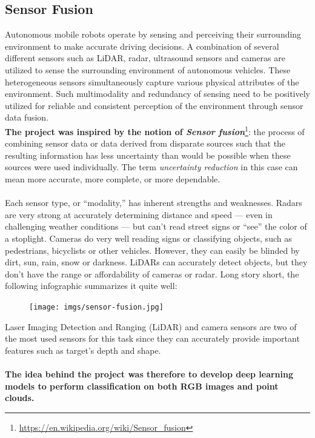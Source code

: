 \documentclass[11pt,a4paper]{article}
\begin{document}
\subsection{Sensor Fusion}
Autonomous mobile robots\cite{s18082730} operate by sensing and perceiving their surrounding environment to make accurate driving decisions. A combination of several different sensors such as LiDAR, radar, ultrasound sensors and cameras are utilized to sense the surrounding environment of autonomous vehicles. These heterogeneous sensors simultaneously capture various physical attributes of the environment. Such multimodality and redundancy of sensing need to be positively utilized for reliable and consistent perception of the environment through sensor data fusion.\\
\textbf{The project was inspired by the notion of \textit{Sensor fusion}}\footnote{\url{https://en.wikipedia.org/wiki/Sensor_fusion}}: the process of combining sensor data or data derived from disparate sources such that the resulting information has less uncertainty than would be possible when these sources were used individually. The term \textit{uncertainty reduction} in this case can mean more accurate, more complete, or more dependable.\\
\\
Each sensor type, or “modality,” has inherent strengths and weaknesses. Radars are very strong at accurately determining distance and speed — even in challenging weather conditions — but can’t read street signs or “see” the color of a stoplight. Cameras do very well reading signs or classifying objects, such as pedestrians, bicyclists or other vehicles. However, they can easily be blinded by dirt, sun, rain, snow or darkness. LiDARs can accurately detect objects, but they don’t have the range or affordability of cameras or radar. Long story short, the following infographic summarizes it quite well:
\begin{figure}[H]
    \centering
    \texttt{[image: imgs/sensor-fusion.jpg]}
\end{figure}
\noindent
Laser Imaging Detection and Ranging (LiDAR)\cite{s21123992} and camera sensors are two of the most used sensors for this task since they can accurately provide important features such as target's depth and shape.\\
\\
\textbf{The idea behind the project was therefore to develop deep learning models to perform classification on both RGB images and point clouds.}\\
\end{document}
